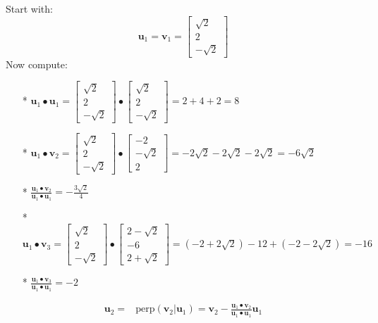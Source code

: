 \documentclass{article}
\begin{document}
\begin{description}
Start with: 
\[\mathbf{u}_1 = \mathbf{v}_1 = \begin{bmatrix} \sqrt{2} \\ 2 \\ -\sqrt{2} \end{bmatrix}\]
Now compute:
\begin{itemize}
\item[*] \(\mathbf{u}_1 \bullet \mathbf{u}_1 = \begin{bmatrix} \sqrt{2} \\ 2 \\ -\sqrt{2} \end{bmatrix} \bullet \begin{bmatrix} \sqrt{2} \\ 2 \\ -\sqrt{2} \end{bmatrix} = 2 + 4 + 2 = 8\)
\item[*] \(\mathbf{u}_1 \bullet \mathbf{v}_2 = \begin{bmatrix} \sqrt{2} \\ 2 \\ -\sqrt{2} \end{bmatrix} \bullet \begin{bmatrix} -2 \\ -\sqrt{2} \\ 2 \end{bmatrix} = -2\sqrt{2} - 2\sqrt{2} - 2\sqrt{2} = -6\sqrt{2}\)
\item[*] \(\frac{\mathbf{u}_1 \bullet \mathbf{v}_2}{\mathbf{u}_1 \bullet \mathbf{u}_1} = -\frac{3\sqrt{2}}{4}\)
\item[*] \(\mathbf{u}_1 \bullet \mathbf{v}_3 = \begin{bmatrix} \sqrt{2} \\ 2 \\ -\sqrt{2} \end{bmatrix} \bullet \begin{bmatrix} 2 - \sqrt{2} \\ -6 \\ 2 + \sqrt{2} \end{bmatrix} = (-2 + 2\sqrt{2}) - 12 + (-2 - 2\sqrt{2}) = -16\)
\item[*] \(\frac{\mathbf{u}_1 \bullet \mathbf{v}_3}{\mathbf{u}_1 \bullet \mathbf{u}_1} = -2\)
\end{itemize}
\begin{align*}
\mathbf{u}_2 = & \text{perp}(\mathbf{v}_2 | \mathbf{u}_1) = \mathbf{v}_2 - \frac{\mathbf{u}_1 \bullet \mathbf{v}_2}{\mathbf{u}_1 \bullet \mathbf{u}_1}\mathbf{u}_1 

\end{align*}
\end{description}
\end{document}
